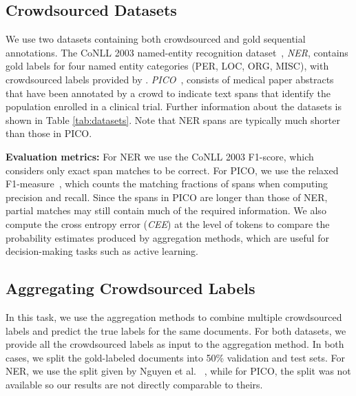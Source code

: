 \subsection{Crowdsourced Datasets}\label{sec:expts}

We use two datasets containing both crowdsourced and gold sequential annotations. 
The CoNLL 2003 named-entity recognition dataset~\cite{tjong2003introduction},
\emph{NER}, contains gold labels for four named entity categories (PER, LOC, ORG, MISC),
with crowdsourced labels provided by \cite{rodrigues2014sequence}.
\emph{PICO}~\cite{nguyen2017aggregating}, 
consists of medical paper abstracts that have been annotated by a crowd to indicate text spans that identify the population enrolled in a clinical trial. 
Further information about the datasets is shown in Table \ref{tab:datasets}. Note that NER spans are typically much shorter than those in PICO.

\textbf{Evaluation metrics:}
For NER we use the CoNLL 2003 F1-score, which considers only exact span matches %
to be correct. 
For PICO, we use the relaxed F1-measure~\cite{nguyen2017aggregating}, which counts the matching fractions of spans when computing precision and recall.
Since the spans in PICO are longer than those of NER, partial matches may still contain much of the required information. 
We also compute the cross entropy error (\emph{CEE}) at the level of tokens
to compare the probability estimates produced by aggregation methods, which are useful for decision-making tasks such as active learning.


\subsection{Aggregating Crowdsourced Labels}\label{sec:task1}

In this task, we use the aggregation methods to combine multiple crowdsourced labels and predict the true labels for the same documents. 
For both datasets, we provide all the crowdsourced labels as input to the aggregation method. 
In both cases, we split the gold-labeled documents into 50\% validation and test sets. 
For NER, we use the split given by Nguyen et al. ~,
while for PICO, the split was not available so our results are not directly comparable to theirs.

